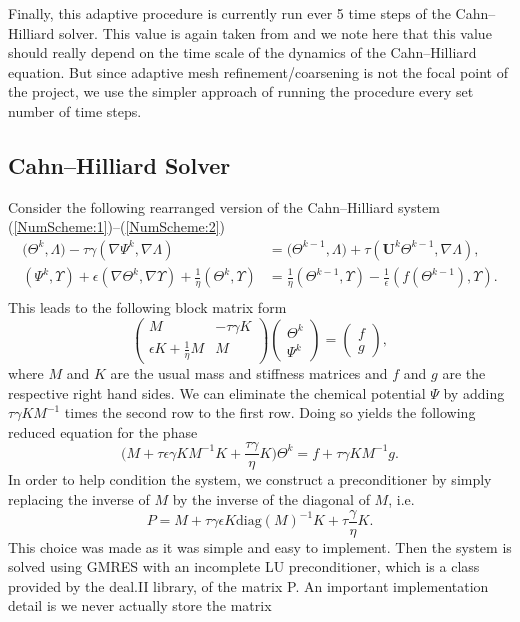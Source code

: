\documentclass[11pt,fullpage]{article}
\newcommand{\eps}{\epsilon}
\newcommand{\grad}{\nabla}
\theoremstyle{lemma}
\theoremstyle{definition}
\theoremstyle{lemma}
\begin{document}
Finally, this adaptive procedure is currently run ever 5 time steps of the Cahn--Hilliard solver. This value is again taken from \cite{DiffuseInterface} and we note here that this value should really depend on the time scale of the dynamics of the Cahn--Hilliard equation. But since adaptive mesh refinement/coarsening is not the focal point of the project, we use the simpler approach of running the procedure every set number of time steps.

\subsection{Cahn--Hilliard Solver}
Consider the following rearranged version of the Cahn--Hilliard system (\ref{NumScheme:1})--(\ref{NumScheme:2})
\begin{align*}
\bigg(\Theta^k, \Lambda\bigg) - \tau\gamma(\grad \Psi^k, \grad \Lambda)&=\bigg(\Theta^{k-1}, \Lambda\bigg) + \tau(\mathbf{U}^k\Theta^{k-1}, \grad\Lambda),\\
(\Psi^k, \Upsilon) + \eps(\grad \Theta^k, \grad \Upsilon) + \frac{1}{\eta}(\Theta^k, \Upsilon) &= \frac{1}{\eta}(\Theta^{k-1}, \Upsilon)-\frac{1}{\eps}(f(\Theta^{k-1}), \Upsilon).\\
\end{align*}
This leads to the following block matrix form
$$\begin{pmatrix}
M & -\tau\gamma K \\
\eps K + \frac{1}{\eta}M & M
\end{pmatrix}
\begin{pmatrix}
\Theta^k\\
\Psi^k
\end{pmatrix} = 
\begin{pmatrix}
f\\
g
\end{pmatrix},
$$
where $M$ and $K$ are the usual mass and stiffness matrices and $f$ and $g$ are the respective right hand sides. We can eliminate the chemical potential $\Psi$ by adding $\tau\gamma KM^{-1}$ times the second row to the first row. Doing so yields the following reduced equation for the phase
$$
\bigg(M + \tau\eps\gamma KM^{-1}K + \frac{\tau \gamma}{\eta}K\bigg)\Theta^k = f + \tau \gamma KM^{-1}g.
$$
In order to help condition the system, we construct a preconditioner by simply replacing the inverse of $M$ by the inverse of the diagonal of $M$, i.e.
$$
	P = M + \tau\gamma\eps K\text{diag}(M)^{-1}K + \tau\frac{\gamma}{\eta}K.
$$
This choice was made as it was simple and easy to implement. Then the system is solved using GMRES with an incomplete LU preconditioner, which is a class provided by the deal.II library, of the matrix P. An important implementation detail is we never actually store the matrix
\end{document}

